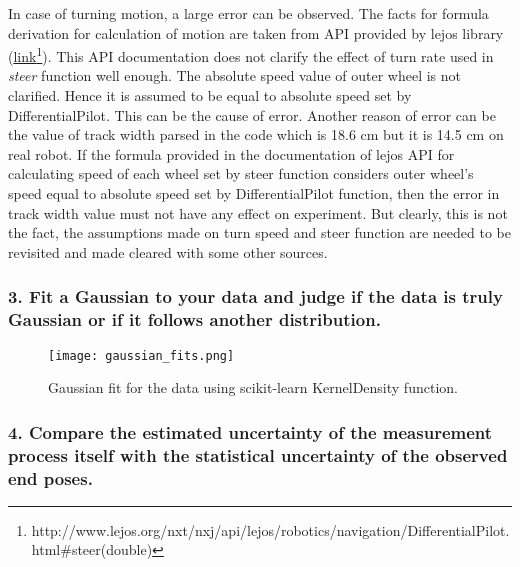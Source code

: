 In case of turning motion, a large error can be observed. The facts for formula derivation for calculation of motion are taken from API provided by lejos library (\href{http://www.lejos.org/nxt/nxj/api/lejos/robotics/navigation/DifferentialPilot.html#steer(double)}{link}\footnote{http://www.lejos.org/nxt/nxj/api/lejos/robotics/navigation/DifferentialPilot.html$\#$steer(double)}). This API documentation does not clarify the effect of turn rate used in \textit{steer} function well enough. The absolute speed value of outer wheel is not clarified. Hence it is assumed to be equal to absolute speed set by DifferentialPilot. This can be the cause of error.
Another reason of error can be the value of track width parsed in the code which is 18.6 cm but it is 14.5 cm on real robot.
If the formula provided in the documentation of lejos API for calculating speed of each wheel set by steer function considers outer wheel's speed equal to absolute speed set by DifferentialPilot function, then the error in track width value must not have any effect on experiment. But clearly, this is not the fact, the assumptions made on turn speed and steer function are needed to be revisited and made cleared with some other sources.      

\newpage
\subsubsection*{3. Fit a Gaussian to your data and judge if the data is truly Gaussian or if it follows another distribution.}

\begin{figure}[ht]
\centering
\texttt{[image: gaussian\_fits.png]}
\caption{Gaussian fit for the data using scikit-learn KernelDensity function. }
\label{gaussian}
\end{figure}

\newpage
\subsubsection*{4. Compare the estimated uncertainty of the measurement process itself with the statistical uncertainty of the observed end poses.}

